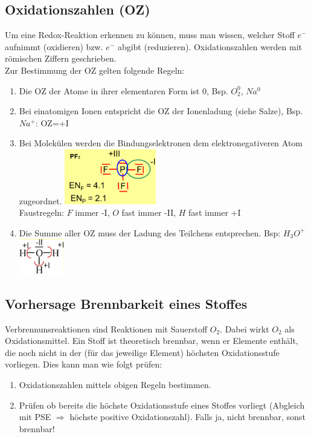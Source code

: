 \subsection{Oxidationszahlen (OZ)}
Um eine Redox-Reaktion erkennen zu können, muss man wissen, welcher Stoff $e^-$ aufnimmt (oxidieren) bzw. $e^-$ abgibt (reduzieren). Oxidationszahlen werden mit römischen Ziffern geschrieben. \\
Zur Bestimmung der OZ gelten folgende Regeln:
\begin{enumerate}
	\item Die OZ der Atome in ihrer elementaren Form ist 0, Bsp. $O_2^0$, $Na^0$
	\item Bei einatomigen Ionen entspricht die OZ der Ionenladung (siehe Salze), Bsp. $Na^+$: OZ=+I
	\item Bei Molekülen werden die Bindungselektronen dem elektronegativeren Atom zugeordnet. 
	\includegraphics[width=4cm]{images/RedoxRegel3.png}\\
	Faustregeln: $F$ immer -I, $O$ fast immer -II, $H$ fast immer +I
	\item Die Summe aller OZ muss der Ladung des Teilchens entsprechen. Bsp: $H_3O^+$\\
	\includegraphics[width=2cm]{images/RedoxRegel4.png}
\end{enumerate}

\subsection{Vorhersage Brennbarkeit eines Stoffes}
Verbrennunsreaktionen sind Reaktionen mit Sauerstoff $O_2$. Dabei wirkt $O_2$ als Oxidationsmittel. Ein Stoff ist theoretisch brennbar, wenn er Elemente enthält, die noch nicht in der (für das jeweilige Element) höchsten Oxidationsstufe vorliegen. Dies kann man wie folgt prüfen:
\begin{enumerate}
\item Oxidationszahlen mittels obigen Regeln bestimmen.
\item Prüfen ob bereits die höchste Oxidationsstufe eines Stoffes vorliegt (Abgleich mit PSE $\Rightarrow$ höchste positive Oxidationszahl). Falls ja, nicht brennbar, sonst brennbar!
\end{enumerate}

